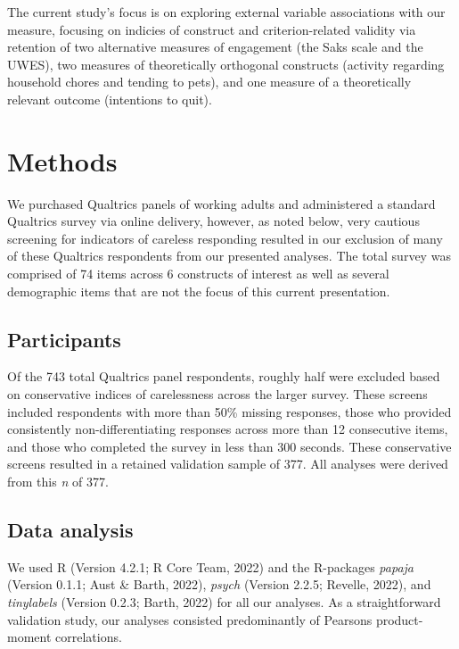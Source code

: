 \documentclass[
  man]{apa6}
\begin{document}
The current study's focus is on exploring external variable associations with our measure, focusing on indicies of construct and criterion-related validity via retention of two alternative measures of engagement (the Saks scale and the UWES), two measures of theoretically orthogonal constructs (activity regarding household chores and tending to pets), and one measure of a theoretically relevant outcome (intentions to quit).

\hypertarget{methods}{%
\section{Methods}\label{methods}}

We purchased Qualtrics panels of working adults and administered a standard Qualtrics survey via online delivery, however, as noted below, very cautious screening for indicators of careless responding resulted in our exclusion of many of these Qualtrics respondents from our presented analyses. The total survey was comprised of 74 items across 6 constructs of interest as well as several demographic items that are not the focus of this current presentation.

\hypertarget{participants}{%
\subsection{Participants}\label{participants}}

Of the 743 total Qualtrics panel respondents, roughly half were excluded based on conservative indices of carelessness across the larger survey. These screens included respondents with more than 50\% missing responses, those who provided consistently non-differentiating responses across more than 12 consecutive items, and those who completed the survey in less than 300 seconds. These conservative screens resulted in a retained validation sample of 377. All analyses were derived from this \emph{n} of 377.

\hypertarget{data-analysis}{%
\subsection{Data analysis}\label{data-analysis}}

We used R (Version 4.2.1; R Core Team, 2022) and the R-packages \emph{papaja} (Version 0.1.1; Aust \& Barth, 2022), \emph{psych} (Version 2.2.5; Revelle, 2022), and \emph{tinylabels} (Version 0.2.3; Barth, 2022) for all our analyses. As a straightforward validation study, our analyses consisted predominantly of Pearsons product-moment correlations.
\end{document}
